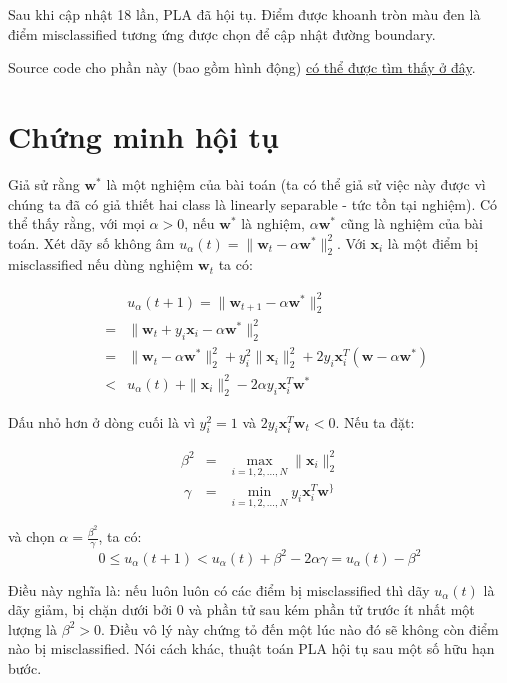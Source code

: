 Sau khi cập nhật 18 lần, PLA đã hội tụ. Điểm được khoanh tròn màu đen là điểm misclassified tương ứng được chọn để cập nhật đường boundary.  
 
Source code cho phần này (bao gồm hình động) \href{https://github.com/tiepvupsu/tiepvupsu.github.io/blob/master/assets/pla/perceptron.py}{có thể được tìm thấy ở đây}. 
 
 
\section{Chứng minh hội tụ}
 
Giả sử rằng $\mathbf{w}^*$ là một nghiệm của bài toán (ta có thể giả sử việc này được vì chúng ta đã có giả thiết hai class là linearly separable - tức tồn tại nghiệm). Có thể thấy rằng, với mọi $\alpha > 0$, nếu $\mathbf{w}^*$ là nghiệm, $\alpha\mathbf{w}^*$ cũng là nghiệm của bài toán. Xét dãy số không âm $ u_{\alpha}(t) = \|\mathbf{w}_{t} - \alpha\mathbf{w}^*\|_2^2$. Với $\mathbf{x}_i$ là một điểm bị misclassified nếu dùng nghiệm $\mathbf{w}_t$ ta có:  
 
 
 
 
\begin{eqnarray} 
    &&u_{\alpha}(t+1) = \|\mathbf{w}_{t+1} - \alpha \mathbf{w}^*\|_2^2 \\\ 
    &=& \|\mathbf{w}_{t} + y_i\mathbf{x}_i - \alpha\mathbf{w}^*\|_2^2 \\\ 
    &=& \|\mathbf{w}_{t} -\alpha\mathbf{w}^*\|_2^2 + y_i^2\|\mathbf{x}_i\|_2^2 + 2y_i\mathbf{x}_i^T(\mathbf{w} - \alpha\mathbf{w}^*) \\\ 
    &<& u_{\alpha}(t) \ + \|\mathbf{x}_i\|_2^2 - 2\alpha y_i\mathbf{x}_i^T \mathbf{w}^* 
\end{eqnarray} 
 
 
Dấu nhỏ hơn ở dòng cuối là vì $y_i^2 = 1$ và $2y_i\mathbf{x}_i^T\mathbf{w}_{t} < 0$. Nếu ta đặt:  
 
\begin{eqnarray} 
\beta^2 &=& \max_{i=1, 2, \dots, N}\|\mathbf{x}_i\|_2^2 \\\ 
\gamma &=& \min_{i=1, 2, \dots, N} y_i\mathbf{x}_i^T\mathbf{w}^\} 
\end{eqnarray} 
 
và chọn $\alpha = \frac{\beta^2}{\gamma}$, ta có: 
\begin{equation} 
0 \leq u_{\alpha}(t+1) < u_{\alpha}(t) + \beta^2 - 2\alpha\gamma = u_{\alpha}(t) - \beta^2 
\end{equation} 
 
Điều này nghĩa là: nếu luôn luôn có các điểm bị misclassified thì dãy $u_{\alpha}(t)$ là dãy giảm, bị chặn dưới bởi 0 và phần tử sau kém phần tử trước ít nhất một lượng là $\beta^2>0$. Điều vô lý này chứng tỏ đến một lúc nào đó sẽ không còn điểm nào bị misclassified. Nói cách khác, thuật toán PLA hội tụ sau một số hữu hạn bước.  
 
